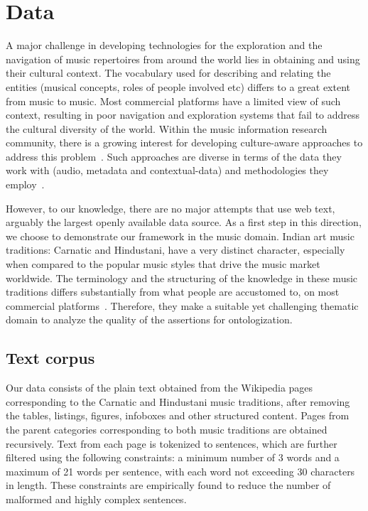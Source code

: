\documentclass{llncs}
\begin{document}
\section{Data}
\label{sec:data}
A major challenge in developing technologies for the exploration and the navigation of music repertoires from around the world lies in obtaining and using their cultural context. The vocabulary used for describing and relating the entities (musical concepts, roles of people involved etc) differs to a great extent from music to music. Most commercial platforms have a limited view of such context, resulting in poor navigation and exploration systems that fail to address the cultural diversity of the world.  Within the music information research community, there is a growing interest for developing culture-aware approaches to address this problem~\cite{Serra2011}. Such approaches are diverse in terms of the data they work with (audio, metadata and contextual-data) and methodologies they employ~\cite{Serra2013a}. 

However, to our knowledge, there are no major attempts that use web text, arguably the largest openly available data source. As a first step in this direction, we choose to demonstrate our framework in the music domain. Indian art music traditions: Carnatic and Hindustani, have a very distinct character, especially when compared to the popular music styles that drive the music market worldwide. The terminology and the structuring of the knowledge in these music traditions differs substantially from what people are accustomed to, on most commercial platforms~\cite{Krishna2012}. Therefore, they make a suitable yet challenging thematic domain to analyze the quality of the assertions for ontologization.

\subsection{Text corpus}
Our data consists of the plain text obtained from the Wikipedia pages corresponding to the Carnatic and Hindustani music traditions, after removing the tables, listings, figures, infoboxes and other structured content. Pages from the parent categories corresponding to both music traditions are obtained recursively. Text from each page is tokenized to sentences, which are further filtered using the following constraints: a minimum number of 3 words and a maximum of 21 words per sentence, with each word not exceeding 30 characters in length. These constraints are empirically found to reduce the number of malformed and highly complex sentences.
\end{document}
